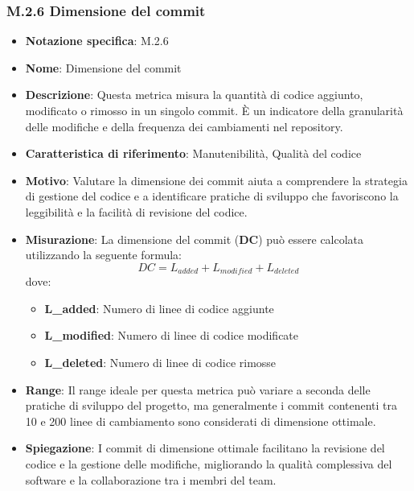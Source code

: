 \subsubsection{M.2.6 Dimensione del commit}
\begin{itemize}
    \item \textbf{Notazione specifica}: M.2.6
    \item \textbf{Nome}: Dimensione del commit
    \item \textbf{Descrizione}: Questa metrica misura la quantità di codice aggiunto, modificato o rimosso in un singolo commit. È un indicatore della granularità delle modifiche e della frequenza dei cambiamenti nel repository.
    \item \textbf{Caratteristica di riferimento}: Manutenibilità, Qualità del codice
    \item \textbf{Motivo}: Valutare la dimensione dei commit aiuta a comprendere la strategia di gestione del codice e a identificare pratiche di sviluppo che favoriscono la leggibilità e la facilità di revisione del codice.
    \item \textbf{Misurazione}: La dimensione del commit (\textbf{DC}) può essere calcolata utilizzando la seguente formula:
    \[ DC = L_{added} + L_{modified} + L_{deleted} \]
    dove:
    \begin{itemize}
        \item \textbf{L_{added}}: Numero di linee di codice aggiunte
        \item \textbf{L_{modified}}: Numero di linee di codice modificate
        \item \textbf{L_{deleted}}: Numero di linee di codice rimosse
    \end{itemize}
    \item \textbf{Range}: Il range ideale per questa metrica può variare a seconda delle pratiche di sviluppo del progetto, ma generalmente i commit contenenti tra 10 e 200 linee di cambiamento sono considerati di dimensione ottimale.
    \item \textbf{Spiegazione}: I commit di dimensione ottimale facilitano la revisione del codice e la gestione delle modifiche, migliorando la qualità complessiva del software e la collaborazione tra i membri del team.
\end{itemize}
